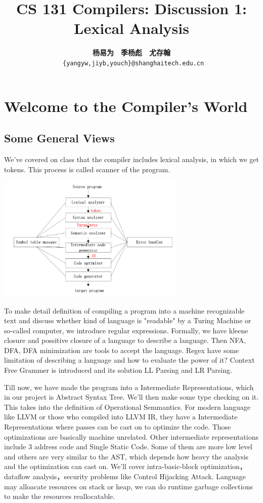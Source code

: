 \documentclass[a4paper]{article}
\title{CS 131 Compilers: Discussion 1: Lexical Analysis}
\author{\textbf{杨易为}~~\textbf{季杨彪}~~\textbf{尤存翰} \\ \texttt{ \{yangyw,jiyb,youch\}@shanghaitech.edu.cn}}
\theoremstyle{definition}
\begin{document}
\maketitle
\section{Welcome to the Compiler's World}
\subsection{Some General Views}

We've covered on class that the compiler includes lexical analysis, in which we get tokens. This process is called scanner of the program.
\begin{center}
\includegraphics[height=6cm]{img/01-phases.png}
\end{center}

To make detail definition of compiling a program into a machine recognizable text and discuss whether kind of language is "readable" by a Turing Machine or so-called computer, we introduce regular expressions. Formally, we have kleene closure and possitive closure of a language to describe a language. Then NFA, DFA, DFA minimization are tools to accept the language. Regex have some limitation of describing a language and how to evaluate the power of it? Context Free Grammer is introduced and its solution LL Parsing and LR Parsing.

Till now, we have made the program into a Intermediate Representations, which in our project is Abstract Syntax Tree. We'll then make some type checking on it. This takes into the definition of Operational Semmantics. For modern language like LLVM or those who compiled into LLVM IR, they have a Intermediate Representations where passes can be cast on to optimize the code. Those optimizations are basically machine unrelated. Other intermediate representations include 3 address code and Single Static Code. Some of them are more low level and others are very similar to the AST, which depends how heavy the analysis and the optimization can cast on. We'll cover intra-basic-block optimization，dataflow analysis，security problems like Control Hijacking Attack. Language may alloacate resources on stack or heap, we can do runtime garbage collections to make the resources reallocatable.
\end{document}
